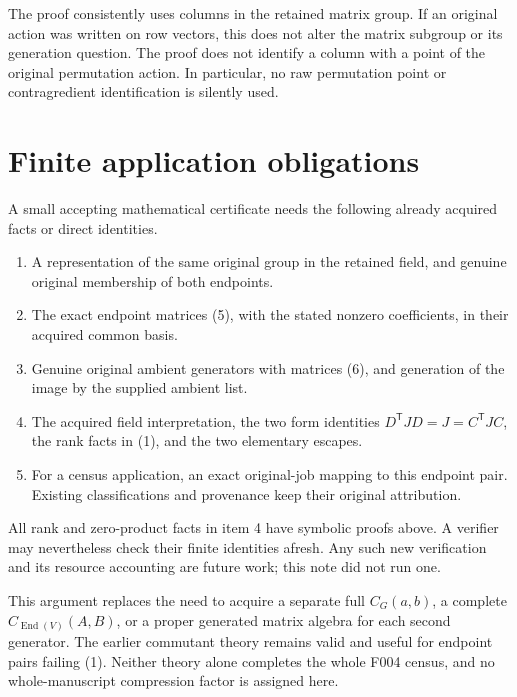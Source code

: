 \documentclass[11pt]{article}
\begin{document}
The proof consistently uses columns in the retained matrix group.
If an original action was written on row vectors, this does not
alter the matrix subgroup or its generation question. The proof
does not identify a column with a point of the original permutation
action. In particular, no raw permutation point or contragredient
identification is silently used.

\section*{Finite application obligations}

A small accepting mathematical certificate needs the following
already acquired facts or direct identities.
\begin{enumerate}
\item A representation of the same original group in the retained
      field, and genuine original membership of both endpoints.
\item The exact endpoint matrices (5), with the stated nonzero
      coefficients, in their acquired common basis.
\item Genuine original ambient generators with matrices (6), and
      generation of the image by the supplied ambient list.
\item The acquired field interpretation, the two form identities
      \(D^{\mathsf T}JD=J=C^{\mathsf T}JC\), the rank facts in (1),
      and the two elementary escapes.
\item For a census application, an exact original-job mapping to
      this endpoint pair. Existing classifications and provenance
      keep their original attribution.
\end{enumerate}
All rank and zero-product facts in item 4 have symbolic proofs above.
A verifier may nevertheless check their finite identities afresh.
Any such new verification and its resource accounting are future
work; this note did not run one.

This argument replaces the need to acquire a separate full
\(C_G(a,b)\), a complete \(C_{\operatorname{End}(V)}(A,B)\), or a
proper generated matrix algebra for each second generator.
The earlier commutant theory remains valid and useful for
endpoint pairs failing (1). Neither theory alone completes the
whole F004 census, and no whole-manuscript compression factor is
assigned here.
\end{document}
